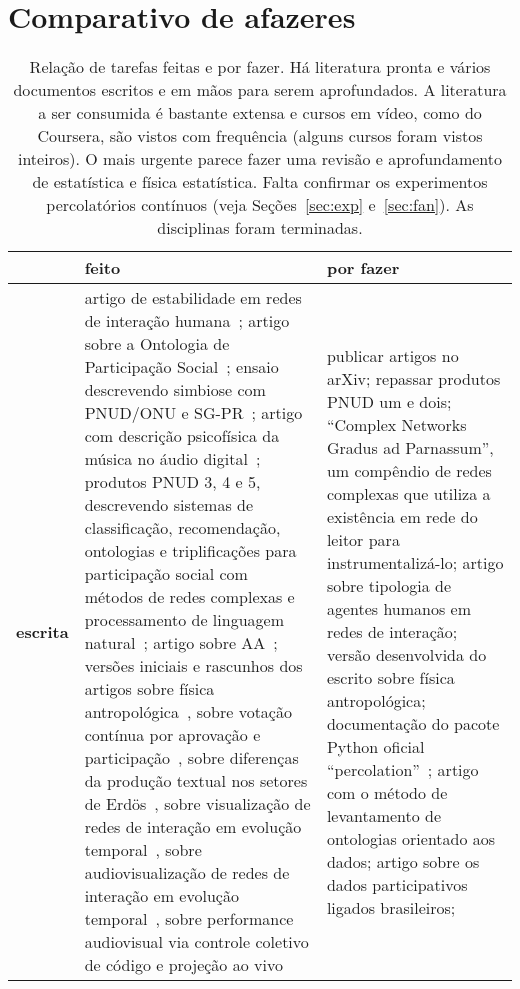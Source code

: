 \documentclass[a4paper,openright,12pt]{report} %
\begin{document}
\section{Comparativo de afazeres}\label{sec:afa}
\begin{table}[h]
\centering
\footnotesize
\caption{Relação de tarefas feitas e por fazer. Há literatura pronta e vários documentos escritos e em mãos para serem aprofundados. A literatura a ser consumida é bastante extensa e cursos em vídeo, como do Coursera,
são vistos com frequência (alguns cursos foram vistos inteiros).
O mais urgente parece fazer uma revisão e aprofundamento de estatística
e física estatística. Falta confirmar os experimentos percolatórios contínuos (veja Seções~\ref{sec:exp} e~\ref{sec:fan}).
As disciplinas foram terminadas.}\label{tab:afa}
\begin{tabular}{p{1.3cm}||p{7.6cm}|p{7.1cm}}\hline
    & {\bf feito} & {\bf por fazer} \\\hline
    {\bf escrita}      & artigo de estabilidade em redes de interação humana~\cite{timeS};
    artigo sobre a Ontologia de Participação Social~\cite{ops};
    ensaio descrevendo simbiose com PNUD/ONU e SG-PR~\cite{ensaioAA};
    artigo com descrição psicofísica da música no áudio digital~\cite{massa};
    produtos PNUD 3, 4 e 5, descrevendo sistemas de classificação, recomendação, ontologias e triplificações para participação social com métodos de redes complexas e processamento de linguagem natural~\cite{pnud3,pnud4,pnud5};
    artigo sobre AA~\cite{paaper}; 
    versões iniciais e rascunhos dos artigos sobre física antropológica~\cite{pa},
    sobre votação contínua por aprovação e participação~\cite{vote},
    sobre diferenças da produção textual nos setores de Erdös~\cite{rcText},
    sobre visualização de redes de interação em evolução temporal~\cite{versinus},
    sobre audiovisualização de redes de interação em evolução temporal~\cite{versinus},
    sobre performance audiovisual via controle coletivo de código e projeção ao vivo~\cite{vivace}
    & publicar artigos no arXiv; repassar produtos PNUD um e dois;
    ``Complex Networks Gradus ad Parnassum'', um compêndio de redes complexas que utiliza a existência
    em rede do leitor para instrumentalizá-lo;
    artigo sobre tipologia de agentes humanos em redes de interação;
    versão desenvolvida do escrito sobre física antropológica;
    documentação do pacote Python oficial ``percolation''~\cite{percolation};
    artigo com o método de levantamento de ontologias orientado aos dados;
    artigo sobre os dados participativos ligados brasileiros;

\end{tabular}
\end{table}
\end{document}
